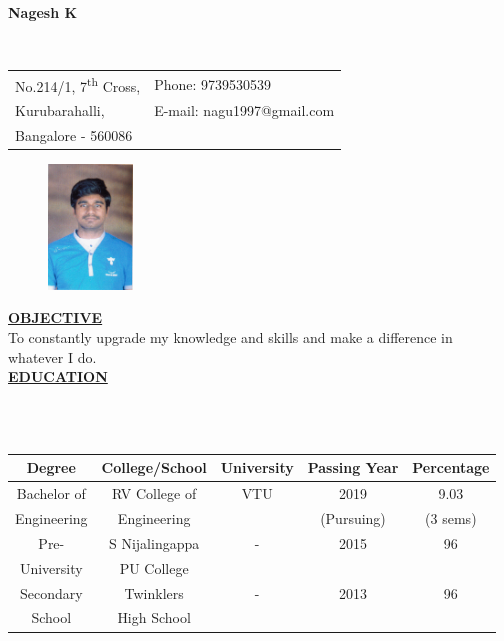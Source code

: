 \documentclass[10pt]{article}
\begin{document}
	
	
\begin{tabbing}
	\hspace{1.75in}
	\LARGE{\bf Nagesh K} %
\end{tabbing}

\makebox[\linewidth]{\rule{18cm}{0.4pt}}
\vspace{.05 in} \\
\noindent\hspace{-1 in}
\begin{tabular}{@{}p{3.25in}p{3in}}
	
	No.214/1, 7\textsuperscript{th} Cross,             & {Phone:}  9739530539 \\
	Kurubarahalli, 
	& {E-mail:}  nagu1997@gmail.com\\
	Bangalore - 560086  
\end{tabular}

	\begin{figure}[h]
		\includegraphics[width=0.2\textwidth,right]{photo.png}
	\end{figure}
	
	
		\underline{\textbf{\Large{OBJECTIVE}}}\\
		
		To constantly upgrade my knowledge and skills and make a difference in whatever I do.\\
		
	\underline{\textbf{\Large{EDUCATION}}}
	\vspace{-0.5cm}
	
	\hfill\\
	\hfill\\
	\begin{tabular}{|c|c|c|c|c|}
		\hline
		\bf Degree & \bf College/School & \bf University & \bf Passing Year & \bf  Percentage \\
		\hline
		Bachelor of & RV College of & VTU & 2019 & 9.03\\
		Engineering &  Engineering &  & (Pursuing) & (3 sems)\\
		\hline
		Pre-& S Nijalingappa & - & 2015 & 96\\
		University & PU College & & &\\
		\hline
		Secondary & Twinklers & - & 2013 & 96 \\
		School & High School & & & \\
		\hline
	\end{tabular}
	
\end{document}

